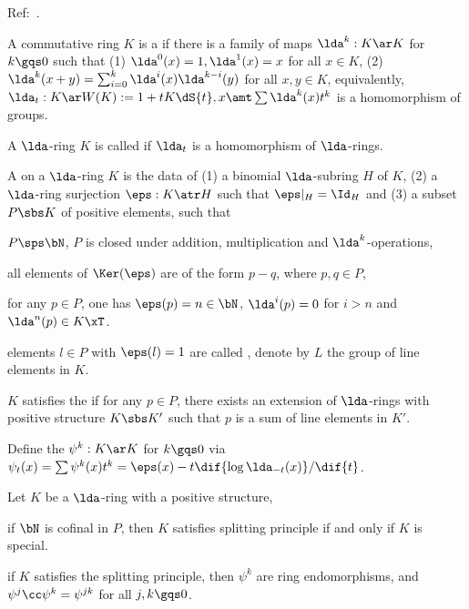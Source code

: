 \documentclass[article, a4paper, twoside]{universal}
\begin{document}
\confighead{}{}{}

Ref:~\cite{Weibel2013}.


\begin{dfn}
    A commutative ring $K$ is a  if there is a family of maps $\lda^{k}:K\ar K$ for $k\gqs0$ such that (1) $\lda^{0}(x)=1,\lda^{1}(x)=x$ for all $x\in K$, (2) $\lda^{k}(x+y)=\sum_{i=0}^{k}\lda^{i}(x)\lda^{k-i}(y)$ for all $x,y\in K$, equivalently, $\lda_{t}:K\ar W(K):=1+tK\dS{t},x\amt\sum\lda^{k}(x)t^{k}$ is a homomorphism of groups.

    A $\lda$-ring $K$ is called  if $\lda_{t}$ is a homomorphism of $\lda$-rings.
\end{dfn}
\begin{dfn}
    A  on a $\lda$-ring $K$ is the data of (1) a binomial $\lda$-subring $H$ of $K$, (2) a $\lda$-ring surjection $\eps:K\atr H$ such that $\eps|_{H}=\Id_{H}$ and (3) a subset $P\sbs K$ of positive elements, such that
    \begin{itm}
        \item $P\sps\bN$, $P$ is closed under addition, multiplication and $\lda^{k}$-operations,
        \item all elements of $\Ker(\eps)$ are of the form $p-q$, where $p,q\in P$,
        \item for any $p\in P$, one has $\eps(p)=n\in\bN$, $\lda^{i}(p)=0$ for $i>n$ and $\lda^{n}(p)\in K\xT$.
    \end{itm}
    elements $l\in P$ with $\eps(l)=1$ are called , denote by $L$ the group of line elements in $K$.

    $K$ satisfies the  if for any $p\in P$, there exists an extension of $\lda$-rings with positive structure $K\sbs K'$ such that $p$ is a sum of line elements in $K'$.


    Define the  $\psi^{k}:K\ar K$ for $k\gqs0$ via $\psi_{t}(x)=\sum\psi^{k}(x)t^{k}=\eps(x)-t\dif{\log\lda_{-t}(x)}/\dif{t}$.
\end{dfn}


\begin{thm}
    Let $K$ be a $\lda$-ring with a positive structure,
    \begin{itm}
        \item if $\bN$ is cofinal in $P$, then $K$ satisfies splitting principle if and only if $K$ is special.
        \item if $K$ satisfies the splitting principle, then $\psi^{k}$ are ring endomorphisms, and $\psi^{j}\cc\psi^{k}=\psi^{jk}$ for all $j,k\gqs0$.
    \end{itm}
\end{thm}
\end{document}
